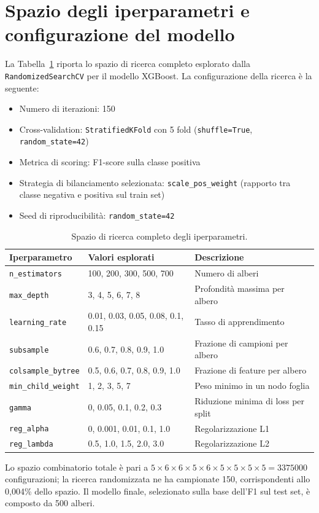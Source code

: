 \section{Spazio degli iperparametri e configurazione del modello}
\label{app:hyperparam}

La Tabella~\ref{tab:hyperparam_full} riporta lo spazio di ricerca completo esplorato dalla \texttt{RandomizedSearchCV} per il modello XGBoost. La configurazione della ricerca è la seguente:

\begin{itemize}
    \item Numero di iterazioni: 150
    \item Cross-validation: \texttt{StratifiedKFold} con 5 fold (\texttt{shuffle=True}, \texttt{random\_state=42})
    \item Metrica di scoring: F1-score sulla classe positiva
    \item Strategia di bilanciamento selezionata: \texttt{scale\_pos\_weight} (rapporto tra classe negativa e positiva sul train set)
    \item Seed di riproducibilità: \texttt{random\_state=42}
\end{itemize}

\begin{table}[htbp]
    \centering
    \caption{Spazio di ricerca completo degli iperparametri.}
    \label{tab:hyperparam_full}
    \begin{tabular}{lll}
        \toprule
        Iperparametro & Valori esplorati & Descrizione \\
        \midrule
        \texttt{n\_estimators}     & 100, 200, 300, 500, 700 & Numero di alberi \\
        \texttt{max\_depth}        & 3, 4, 5, 6, 7, 8 & Profondità massima per albero \\
        \texttt{learning\_rate}    & 0.01, 0.03, 0.05, 0.08, 0.1, 0.15 & Tasso di apprendimento \\
        \texttt{subsample}         & 0.6, 0.7, 0.8, 0.9, 1.0 & Frazione di campioni per albero \\
        \texttt{colsample\_bytree} & 0.5, 0.6, 0.7, 0.8, 0.9, 1.0 & Frazione di feature per albero \\
        \texttt{min\_child\_weight}& 1, 2, 3, 5, 7 & Peso minimo in un nodo foglia \\
        \texttt{gamma}             & 0, 0.05, 0.1, 0.2, 0.3 & Riduzione minima di loss per split \\
        \texttt{reg\_alpha}        & 0, 0.001, 0.01, 0.1, 1.0 & Regolarizzazione L1 \\
        \texttt{reg\_lambda}       & 0.5, 1.0, 1.5, 2.0, 3.0 & Regolarizzazione L2 \\
        \bottomrule
    \end{tabular}
\end{table}

Lo spazio combinatorio totale è pari a $5 \times 6 \times 6 \times 5 \times 6 \times 5 \times 5 \times 5 \times 5 = \num{3375000}$ configurazioni; la ricerca randomizzata ne ha campionate 150, corrispondenti allo 0{,}004\% dello spazio. Il modello finale, selezionato sulla base dell'F1 sul test set, è composto da 500 alberi.
